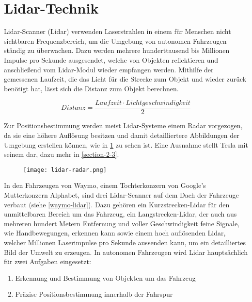 \section{Lidar-Technik}

\acs{Lidar}-Scanner (\acl{Lidar}) verwenden Laserstrahlen in einem für Menschen nicht sichtbaren Frequenzbereich, um die Umgebung von autonomen Fahrzeugen ständig zu überwachen. Dazu werden mehrere hunderttausend bis Millionen Impulse pro Sekunde ausgesendet, welche von Objekten reflektieren und anschließend vom \acs{Lidar}-Modul wieder empfangen werden.  Mithilfe der gemessenen Laufzeit, die das Licht für die Strecke zum Objekt und wieder zurück benötigt hat, lässt sich die Distanz zum Objekt berechnen.

\begin{equation}
  Distanz = \frac{Laufzeit \cdot Lichtgeschwindigkeit}{2}
\end{equation}
\vspace{0.3cm}

Zur Positionsbestimmung werden meist \acs{Lidar}-Systeme einem \acs{Radar} vorgezogen, da sie eine höhere Auflösung besitzen und damit detailliertere Abbildungen der Umgebung erstellen können, wie in \ref{lidar-radar} zu sehen ist. Eine Ausnahme stellt Tesla mit seinem  dar, dazu mehr in \ref{section-2-3}.

\begin{figure}\centering
  \texttt{[image: lidar-radar.png]}
  \label{lidar-radar}
\end{figure}

In den Fahrzeugen von Waymo, einem Tochterkonzern von Google's Mutterkonzern Alphabet, sind drei \acs{Lidar}-Scanner auf dem Dach der Fahrzeuge verbaut (siehe \ref{waymo-lidar}). Dazu gehören ein Kurzstrecken-\acs{Lidar} für den unmittelbaren Bereich um das Fahrzeug, ein Langstrecken-\acs{Lidar}, der auch aus mehreren hundert Metern Entfernung und voller Geschwindigkeit feine Signale, wie Handbewegungen, erkennen kann sowie einem hoch auflösenden \acs{Lidar}, welcher Millionen Laserimpulse pro Sekunde aussenden kann, um ein detailliertes Bild der Umwelt zu erzeugen.  In autonomen Fahrzeugen wird \acs{Lidar} hauptsächlich für zwei Aufgaben eingesetzt:
\begin{enumerate}
  \item{Erkennung und Bestimmung von Objekten um das Fahrzeug}
  \item{Präzise Positionsbestimmung innerhalb der Fahrspur}
\end{enumerate}

